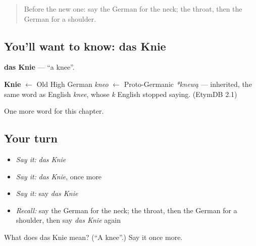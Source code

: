 \begin{quote}
Before the new one: say the German for the neck; the throat, then the German for a shoulder.
\end{quote}

\subsection*{You'll want to know: das Knie}
\textbf{das Knie} — \textquotedblleft{}a knee\textquotedblright{}.

\begin{cousinweb}
\textbf{Knie} $\leftarrow$ Old High German \emph{kneo} $\leftarrow$ Proto-Germanic \emph{*knewą} — inherited, the same word as English \emph{knee}, whose \emph{k} English stopped saying. (EtymDB 2.1)
\end{cousinweb}

\begin{grammarlens}[title={What you've built}]
One more word for this chapter.
\end{grammarlens}

\subsection*{Your turn}
\begin{itemize}
\raggedright
  \item \emph{Say it:} \emph{das Knie}
  \item \emph{Say it:} \emph{das Knie}, once more
  \item \emph{Say it:} say \emph{das Knie}
  \item \emph{Recall:} say the German for the neck; the throat, then the German for a shoulder, then say \emph{das Knie} again
\end{itemize}

\begin{tcolorbox}[breakable,colback=teal!4,colframe=teal!35!black,title={Before you move on}]
What does das Knie mean? (\textquotedblleft{}A knee\textquotedblright{}.) Say it once more.
\end{tcolorbox}
